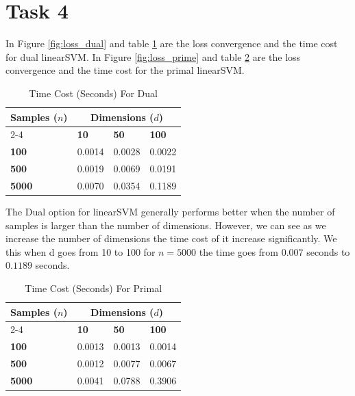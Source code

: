 \documentclass{article}
\begin{document}
\section{Task 4}

In Figure \ref{fig:loss_dual} and table \ref{tab:time-cost_dual} are the loss convergence and the time cost for dual linearSVM. In Figure \ref{fig:loss_prime} and table \ref{tab:time-cost_prime} are the loss convergence and the time cost for the primal linearSVM. 

\begin{table}[htbp]
\centering
\caption{Time Cost (Seconds) For Dual}
\label{tab:time-cost_dual}
\begin{tabular}{@{}llll@{}}
\toprule
\textbf{Samples ($n$)} & \multicolumn{3}{c}{\textbf{Dimensions ($d$)}} \\ \cmidrule(l){2-4} 
 & \textbf{10} & \textbf{50} & \textbf{100} \\ \midrule
\textbf{100}                 & 0.0014      & 0.0028      & 0.0022       \\
\textbf{500}                 & 0.0019      & 0.0069      & 0.0191       \\
\textbf{5000}                & 0.0070      & 0.0354      & 0.1189       \\ \bottomrule
\end{tabular}
\end{table}

The Dual option for linearSVM generally performs better when the number of samples is larger than the number of dimensions. However, we can see as we increase the number of dimensions the time cost of it increase significantly. We this when d goes from 10 to 100 for $n=5000$ the time goes from $0.007$ seconds to $0.1189$ seconds.

\begin{table}[htbp]
\centering
\caption{Time Cost (Seconds) For Primal}
\label{tab:time-cost_prime}
\begin{tabular}{@{}llll@{}}
\toprule
\textbf{Samples ($n$)} & \multicolumn{3}{c}{\textbf{Dimensions ($d$)}} \\ \cmidrule(l){2-4} 
 & \textbf{10} & \textbf{50} & \textbf{100} \\ \midrule
\textbf{100}                 & 0.0013      & 0.0013      & 0.0014       \\
\textbf{500}                 & 0.0012      & 0.0077      & 0.0067       \\
\textbf{5000}                & 0.0041      & 0.0788      & 0.3906       \\ \bottomrule
\end{tabular}
\end{table}
\end{document}
